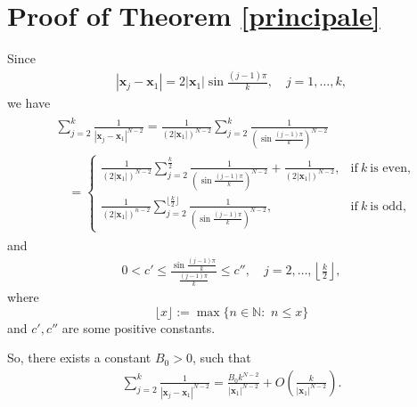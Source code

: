 \documentclass[11pt,a4paper]{amsart}
\begin{document}
 \section{Proof of Theorem \ref{principale}}
 Since
\begin{align*}
  \left|\mathbf{x}_{j}-\mathbf{x}_{1}\right|=2\left|\mathbf{x}_{1}\right| \sin \frac{(j-1) \pi}{k}, \quad j=1, \ldots, k,
\end{align*}
we have
\begin{align*}
\begin{aligned}
& \sum_{j=2}^{k} \frac{1}{\left|\mathbf{x}_{j}-\mathbf{x}_{1}\right|^{N-2}}=\frac{1}{\left(2\left|\mathbf{x}_{1}\right|\right)^{N-2}} \sum_{j=2}^{k} \frac{1}{\left(\sin \frac{(j-1) \pi}{k}\right)^{N-2}} \\
& \quad= \begin{cases}\frac{1}{\left(2\left|\mathbf{x}_{1}\right|\right)^{N-2}} \sum_{j=2}^{\frac{k}{2}} \frac{1}{\left(\sin \frac{(j-1) \pi}{k}\right)^{N-2}}+\frac{1}{\left(2\left|\mathbf{x}_{1}\right|\right)^{N-2}}, & \text{if}~ k ~\text{is even}, \\
\frac{1}{\left(2\left|\mathbf{x}_{1}\right|\right)^{n-2}} \sum_{j=2}^{ \lfloor \frac{k}{2}\rfloor} \frac{1}{\left(\sin \frac{(j-1) \pi}{k}\right)^{N-2}}, & \text {if}~ k ~\text{is odd},\end{cases}
\end{aligned}
\end{align*}
and
\begin{align*}
  0<c' \leq \frac{\sin \frac{(j-1) \pi}{k}}{\frac{(j-1) \pi}{k}} \leq c'', \quad j=2, \ldots,\left\lfloor\frac{k}{2}\right\rfloor,
\end{align*}
where
$$\lfloor x\rfloor:=\max\{n\in\mathbb N:\,\,n\le x\}$$
and $c',c''$ are some positive constants.

So, there exists a constant $B_0>0$, such that
\begin{align*}
\sum_{j=2}^{k} \frac{1}{\left|\mathbf{x}_{j}-\mathbf{x}_{1}\right|^{N-2}}=\frac{B_0 k^{N-2}}{\left|\mathbf{x}_{1}\right|^{N-2}}+O\left(\frac{k}{\left|\mathbf{x}_{1}\right|^{N-2}}\right).
\end{align*}
\end{document}
